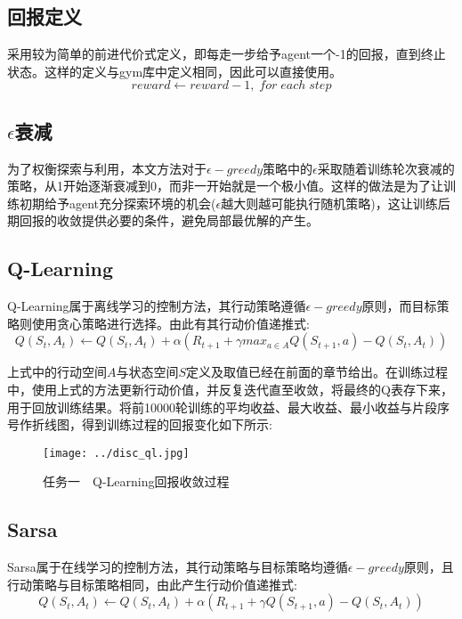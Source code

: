 \documentclass[UTF8]{ctexart}
\begin{document}
\subsection{回报定义}
采用较为简单的前进代价式定义，即每走一步给予agent一个-1的回报，直到终止状态。这样的定义与gym库中定义相同，因此可以直接使用。
\begin{equation}
    reward \leftarrow reward - 1 ,\; for \;each\; step
\end{equation}

\subsection{$\epsilon$衰减}
为了权衡探索与利用，本文方法对于$\epsilon-greedy$策略中的$\epsilon$采取随着训练轮次衰减的策略，从1开始逐渐衰减到0，而非一开始就是一个极小值。这样的做法是为了让训练初期给予agent充分探索环境的机会($\epsilon$越大则越可能执行随机策略)，这让训练后期回报的收敛提供必要的条件，避免局部最优解的产生。


\subsection{Q-Learning}\label{qlearning}
Q-Learning属于离线学习的控制方法，其行动策略遵循$\epsilon-greedy$原则，而目标策略则使用贪心策略进行选择。由此有其行动价值递推式:
\begin{equation}
    Q(S_t,A_t)\leftarrow Q(S_t,A_t) + \alpha(R_{t+1}+\gamma {max}_{a\in A}Q(S_{t+1},a)-Q(S_t,A_t))
\end{equation}

上式中的行动空间$A$与状态空间$S$定义及取值已经在前面的章节给出。在训练过程中，使用上式的方法更新行动价值，并反复迭代直至收敛，将最终的Q表存下来，用于回放训练结果。将前10000轮训练的平均收益、最大收益、最小收益与片段序号作折线图，得到训练过程的回报变化如下所示:
\begin{figure}[H]
    \centering
    \texttt{[image: ../disc\_ql.jpg]}
    \caption{任务一　Q-Learning回报收敛过程}
\end{figure}
\subsection{Sarsa}\label{sarsa}

Sarsa属于在线学习的控制方法，其行动策略与目标策略均遵循$\epsilon-greedy$原则，且行动策略与目标策略相同，由此产生行动价值递推式:
\begin{equation}
    Q(S_t,A_t)\leftarrow Q(S_t,A_t) + \alpha(R_{t+1}+\gamma Q(S_{t+1},a)-Q(S_t,A_t))
\end{equation}
\end{document}
